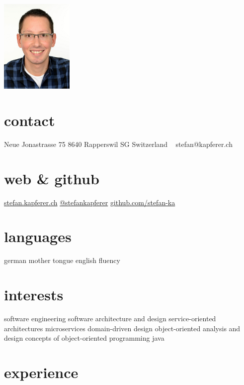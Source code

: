 \documentclass[]{cv-style}
\begin{document}


\begin{aside}
\includegraphics[width=3.5cm]{ska}
%
\section{contact}
Neue Jonastrasse 75
8640 Rapperswil SG
Switzerland
~
stefan@kapferer.ch
%
\section{web \& github}
\href{https://stefan.kapferer.ch}{stefan.kapferer.ch}
\href{https://twitter.com/stefankapferer}{@stefankapferer}
\href{https://github.com/stefan-ka}{github.com/stefan-ka}
%
\section{languages}
german mother tongue
english fluency
%
\section{interests}
software engineering\smallskip
software architecture and design\smallskip
service-oriented architectures\smallskip
microservices\smallskip
domain-driven design\smallskip
object-oriented analysis and design\smallskip
concepts of object-oriented programming\smallskip
java\smallskip
%
\end{aside}


\section{experience}
\end{document}
